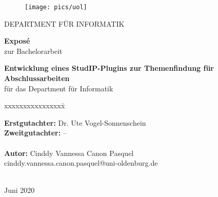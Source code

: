\documentclass[11pt]{scrartcl}
\begin{document}
\begin{titlepage}
 	\begin{centering}
	\begin{figure}[h!]
    \centering
    \texttt{[image: pics/uol]}    %
	\end{figure}
	\large DEPARTMENT FÜR INFORMATIK\\

  	\vspace*{2cm}
  
	\LARGE \textbf{Exposé\\}
	\vspace*{0.2cm}
  	\Large zur Bachelorarbeit\\
  	\vspace*{1cm}  
  
	\textsf{\LARGE \textbf{Entwicklung eines StudIP-Plugins zur Themenfindung für Abschlussarbeiten\\}}
	\vspace*{0.2cm}
	\noindent \large für das Department für Informatik\\

  \end{centering}
  
  \vspace*{3cm}
  \begin{tabbing}
  xxxxxxxxxxxxxxxx\= \kill
  
  \small \textbf{Erstgutachter: }\> Dr. Ute Vogel-Sonnenschein\\
  \small \textbf{Zweitgutachter: }\> --\\\\
  \small \textbf{Autor: }\>Cinddy Vannessa Canon Pasquel\\
  \small \>cinddy.vannessa.canon.pasquel@uni-oldenburg.de\\\\
  \end{tabbing}
  \vspace*{1cm}
  \normalsize \centering Juni 2020
\end{titlepage}
\end{document}
